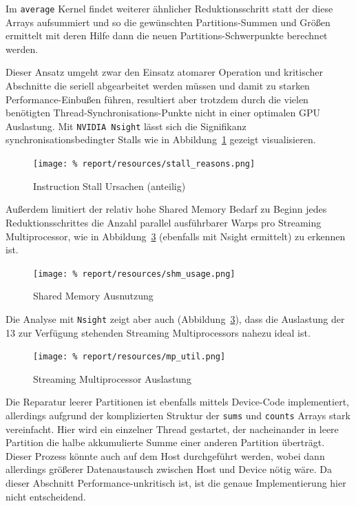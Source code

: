 \documentclass[
    bibliography=totoc, cd=lightcolor, cdmath=false, ngerman]{tudscrreprt}
\begin{document}
\vspace{20pt}

Im \texttt{average} Kernel findet weiterer ähnlicher Reduktionsschritt statt
der diese Arrays aufsummiert und so die gewünschten Partitions-Summen und
Größen ermittelt mit deren Hilfe dann die neuen Partitions-Schwerpunkte
berechnet werden.

Dieser Ansatz umgeht zwar den Einsatz atomarer Operation und kritischer
Abschnitte die seriell abgearbeitet werden müssen und damit zu starken
Performance-Einbußen führen, resultiert aber trotzdem durch die vielen
benötigten Thread-Synchronisations-Punkte nicht in einer optimalen GPU
Auslastung. Mit \texttt{NVIDIA Nsight} lässt sich die Signifikanz
synchronisationsbedingter Stalls wie in Abbildung~\ref{fig:stallreasons}
gezeigt visualisieren.

\begin{figure}[htbp]
  \begin{center}
    \texttt{[image: \%
    report/resources/stall\_reasons.png]}
  \end{center}
  \caption{Instruction Stall Ursachen (anteilig)}
  \label{fig:stallreasons}
\end{figure}

Außerdem limitiert der relativ hohe Shared Memory Bedarf zu Beginn
jedes Reduktionsschrittes die Anzahl parallel ausführbarer Warps pro Streaming
Multiprocessor, wie in Abbildung~\ref{fig:shm} (ebenfalls mit Nsight ermittelt)
zu erkennen ist.

\begin{figure}[htbp]
  \begin{center}
    \texttt{[image: \%
    report/resources/shm\_usage.png]}
  \end{center}
  \caption{Shared Memory Ausnutzung}
  \label{fig:shm}
\end{figure}

Die Analyse mit \texttt{Nsight} zeigt aber auch (Abbildung~\ref{fig:shm}), dass
die Auslastung der 13 zur Verfügung stehenden Streaming Multiprocessors
nahezu ideal ist.

\begin{figure}[htbp]
  \begin{center}
    \texttt{[image: \%
    report/resources/mp\_util.png]}
  \end{center}
  \caption{Streaming Multiprocessor Auslastung}
  \label{fig:shm}
\end{figure}

Die Reparatur leerer Partitionen ist ebenfalls mittels Device-Code
implementiert, allerdings aufgrund der komplizierten Struktur der \texttt{sums}
und \texttt{counts} Arrays stark vereinfacht. Hier wird ein einzelner Thread
gestartet, der nacheinander in leere Partition die halbe akkumulierte Summe
einer anderen Partition überträgt. Dieser Prozess könnte auch auf dem Host
durchgeführt werden, wobei dann allerdings größerer Datenaustausch zwischen
Host und Device nötig wäre. Da dieser Abschnitt Performance-unkritisch ist, ist
die genaue Implementierung hier nicht entscheidend.
\end{document}

